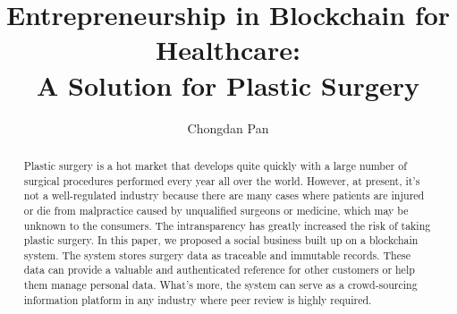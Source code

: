 \documentclass{article}
\title{Entrepreneurship in Blockchain for Healthcare: \\A Solution for Plastic Surgery}
\author{Chongdan Pan}
\begin{document}
\maketitle

\begin{abstract}
Plastic surgery is a hot market that develops quite quickly with a large number of surgical procedures performed every year all over the world. However, at present, it's not a well-regulated industry because there are many cases where patients are injured or die from malpractice caused by unqualified surgeons or medicine, which may be unknown to the consumers. The intransparency has greatly increased the risk of taking plastic surgery. In this paper, we proposed a social business built up on a blockchain system. The system stores surgery data as traceable and immutable records. These data can provide a valuable and authenticated reference for other customers or help them manage personal data. What's more, the system can serve as a crowd-sourcing information platform in any industry where peer review is highly required.
\end{abstract}
\end{document}
